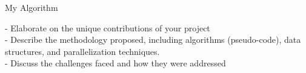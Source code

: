 \documentclass[conference]{IEEEtran}
\begin{document}
\iffalse %
  \begin{algorithm}
    \caption{My Algorithm}\label{euclid}
    \begin{algoritmic}[1]
      \EndProcedure
    \end{algoritmic}
  \end{algorithm}
\endif 

- Elaborate on the unique contributions of your project \\
- Describe the methodology proposed, including algorithms (pseudo-code),
data structures, and parallelization techniques. \\
- Discuss the challenges faced and how they were addressed \\
\end{document}

